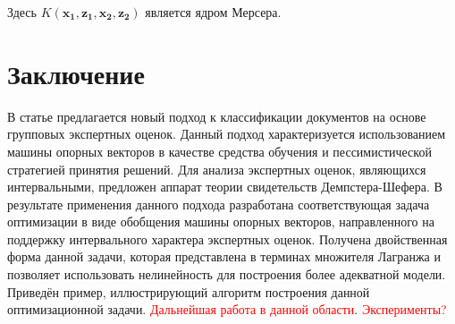 \documentclass[12pt,a4paper,oneside]{article}
\begin{document}
\par
Здесь \(K(\mathbf{x_1}, \mathbf{z_1}, \mathbf{x_2}, \mathbf{z_2})\) является ядром Мерсера. 

\section{Заключение}
\label{sec:conclusions}

\par
В статье предлагается новый подход к классификации документов на основе групповых экспертных оценок.
Данный подход характеризуется использованием машины опорных векторов в качестве средства обучения и пессимистической стратегией принятия решений. 
Для анализа экспертных оценок, являющихся интервальными, предложен аппарат теории свидетельств Демпстера-Шефера. 
В результате применения данного подхода разработана соответствующая задача оптимизации в виде обобщения машины опорных векторов, направленного на поддержку интервального характера экспертных оценок. 
Получена двойственная форма данной задачи, которая представлена в терминах множителя Лагранжа и позволяет использовать нелинейность для построения более адекватной модели. 
Приведён пример, иллюстрирующий алгоритм построения данной оптимизационной задачи. 
\textcolor{red}{Дальнейшая работа в данной области}. 
\textcolor{red}{Эксперименты?} 

\end{document}
